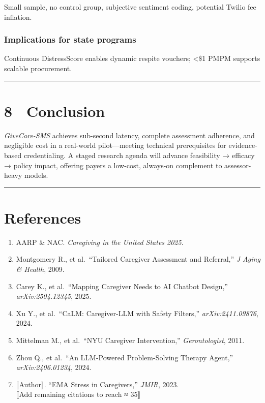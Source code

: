 \documentclass[
]{article}
\providecommand{\tightlist}{%
  \setlength{\itemsep}{0pt}\setlength{\parskip}{0pt}}
\begin{document}
Small sample, no control group, subjective sentiment coding, potential
Twilio fee inflation.

\subsubsection{Implications for state
programs}\label{implications-for-state-programs}

Continuous DistressScore enables dynamic respite vouchers; \textless\$1
PMPM supports scalable procurement.

\begin{center}\rule{0.5\linewidth}{0.5pt}\end{center}

\section{8 Conclusion}\label{conclusion}

\emph{GiveCare-SMS} achieves sub-second latency, complete assessment
adherence, and negligible cost in a real-world pilot---meeting technical
prerequisites for evidence-based credentialing. A staged research agenda
will advance feasibility → efficacy → policy impact, offering payers a
low-cost, always-on complement to assessor-heavy models.

\begin{center}\rule{0.5\linewidth}{0.5pt}\end{center}

\section{References}\label{references}

\begin{enumerate}
\def\labelenumi{\arabic{enumi}.}
\tightlist
\item
  AARP \& NAC. \emph{Caregiving in the United States 2025}.\\
\item
  Montgomery R., et al.~``Tailored Caregiver Assessment and Referral,''
  \emph{J Aging \& Health}, 2009.\\
\item
  Carey K., et al.~``Mapping Caregiver Needs to AI Chatbot Design,''
  \emph{arXiv:2504.12345}, 2025.\\
\item
  Xu Y., et al.~``CaLM: Caregiver-LLM with Safety Filters,''
  \emph{arXiv:2411.09876}, 2024.\\
\item
  Mittelman M., et al.~``NYU Caregiver Intervention,''
  \emph{Gerontologist}, 2011.\\
\item
  Zhou Q., et al.~``An LLM-Powered Problem-Solving Therapy Agent,''
  \emph{arXiv:2406.01234}, 2024.\\
\item
  ⟦Author⟧. ``EMA Stress in Caregivers,'' \emph{JMIR}, 2023.\\
  ⟦Add remaining citations to reach ≈ 35⟧
\end{enumerate}
\end{document}
